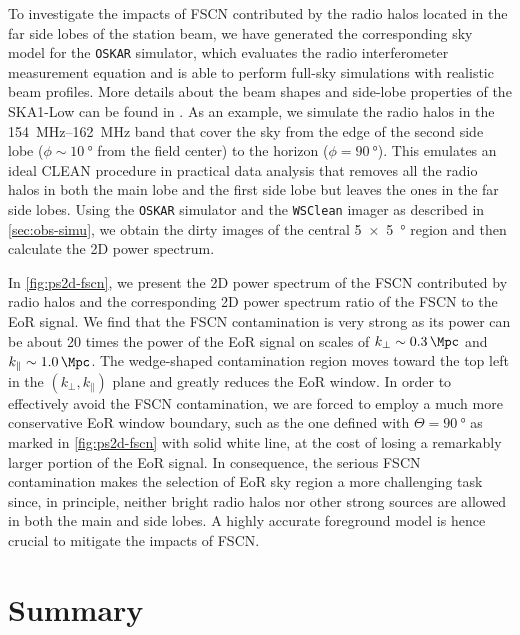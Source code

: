\documentclass[twocolumn]{aastex62}
\newcommand{\klos}{\text{$k_{\parallel}$}}
\newcommand{\kperp}{\text{$k_{\bot}$}}
\begin{document}
To investigate the impacts of FSCN contributed by the radio halos
located in the far side lobes of the station beam, we have generated
the corresponding sky model for the \texttt{OSKAR} simulator,
which evaluates the radio interferometer measurement equation
\citep{smirnov2011} and is able to perform full-sky simulations with
realistic beam profiles.
More details about the beam shapes and side-lobe properties of the
SKA1-Low can be found in \citet{mort2017}.
As an example, we simulate the radio halos in the \SIrange{154}{162}{\MHz}
band that cover the sky from the edge of the second side lobe
($\phi \sim \SI{10}{\degree}$ from the field center) to the horizon
($\phi = \SI{90}{\degree}$).
This emulates an ideal CLEAN procedure in practical data analysis that
removes all the radio halos in both the main lobe and the first side lobe
but leaves the ones in the far side lobes.
Using the \texttt{OSKAR} simulator and the \texttt{WSClean} imager as
described in \autoref{sec:obs-simu}, we obtain the dirty images of the
central \SI[product-units=repeat]{5 x 5}{\degree} region and then
calculate the 2D power spectrum.

In \autoref{fig:ps2d-fscn}, we present the 2D power spectrum of the FSCN
contributed by radio halos and the corresponding 2D power spectrum ratio
of the FSCN to the EoR signal.
We find that the FSCN contamination is very strong as its power can be
about 20 times the power of the EoR signal on scales of
$\kperp \sim \SI{0.3}{\per\Mpc}$ and $\klos \sim \SI{1.0}{\per\Mpc}$.
The wedge-shaped contamination region moves toward the top left in
the $(\kperp, \klos)$ plane and greatly reduces the EoR window.
In order to effectively avoid the FSCN contamination, we are forced to
employ a much more conservative EoR window boundary, such as the one
defined with $\Theta = \SI{90}{\degree}$ as marked in
\autoref{fig:ps2d-fscn} with solid white line, at the cost of losing
a remarkably larger portion of the EoR signal.
In consequence,
the serious FSCN contamination makes the selection of EoR sky region
a more challenging task since, in principle, neither bright radio halos
nor other strong sources are allowed in both the main and side lobes.
A highly accurate foreground model is hence crucial to mitigate the
impacts of FSCN.


\section{Summary}
\label{sec:summary}
\end{document}

